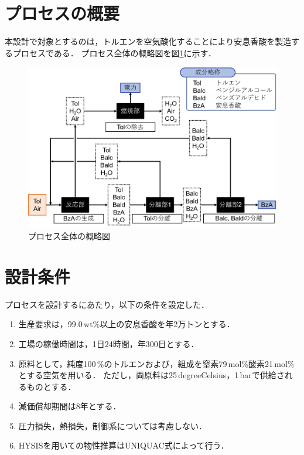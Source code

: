 \documentclass[a4j]{jsreport}
\begin{document}
\section{プロセスの概要}
本設計で対象とするのは，トルエンを空気酸化することにより安息香酸を製造するプロセスである．
プロセス全体の概略図を図\ref{プロセス全体の概略図}に示す．
\begin{figure}[htbp]
  \centering
  \includegraphics[scale=0.6]{processOutline.png}
  \caption{プロセス全体の概略図}
  \label{プロセス全体の概略図}
\end{figure}

\section{設計条件}
プロセスを設計するにあたり，以下の条件を設定した．
\begin{enumerate}
  \item 生産要求は，99.0\,wt\%以上の安息香酸を年2万トンとする．\\
  \item 工場の稼働時間は，1日24時間，年300日とする．\\
  \item 原料として，純度100\,\%のトルエンおよび，組成を窒素79\,mol\%酸素21\,mol\%とする空気を用いる．
           ただし，両原料は25\,\si{degreeCelsius}，1\,\si{\bar}で供給されるものとする．\\
  \item 減価償却期間は8年とする．\\
  \item 圧力損失，熱損失，制御系については考慮しない．\\
  \item HYSISを用いての物性推算はUNIQUAC式によって行う．
\end{enumerate}
\end{document}

